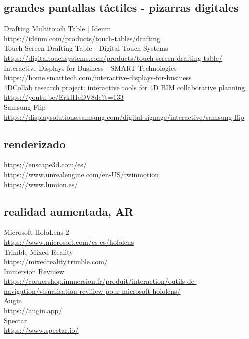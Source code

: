 \documentclass[spanish,12pt,a4paper,final,oneside]{book}
\begin{document}
\subsection{grandes pantallas táctiles - pizarras digitales}
Drafting Multitouch Table | Ideum \\ \url{https://ideum.com/products/touch-tables/drafting}
\\ Touch Screen Drafting Table - Digital Touch Systems \\ \url{https://digitaltouchsystems.com/products/touch-screen-drafting-table/}
\\ Interactive Displays for Business - SMART Technologies \\ \url{https://home.smarttech.com/interactive-displays-for-business}
\\ 4DCollab research project: interactive tools for 4D BIM collaborative planning
\\ \url{https://youtu.be/ErkIHeDV8dc?t=133}
\\ Samsung Flip \\ \url{https://displaysolutions.samsung.com/digital-signage/interactive/samsung-flip}


\subsection{renderizado}
\url{https://enscape3d.com/es/}
\\ \url{https://www.unrealengine.com/en-US/twinmotion}
\\ \url{https://www.lumion.es/}


\subsection{realidad aumentada, AR}
Microsoft HoloLens 2 \\ \url{https://www.microsoft.com/es-es/hololens}
\\ Trimble Mixed Reality \\ \url{https://mixedreality.trimble.com/}
\\ Immersion Reviiiew \\ \url{https://cornershop.immersion.fr/produit/interaction/outils-de-navigation/visualisation-reviiiew-pour-microsoft-hololens/}
\\ Augin \\ \url{https://augin.app/}
\\ Spectar \\ \url{https://www.spectar.io/}
\end{document}
